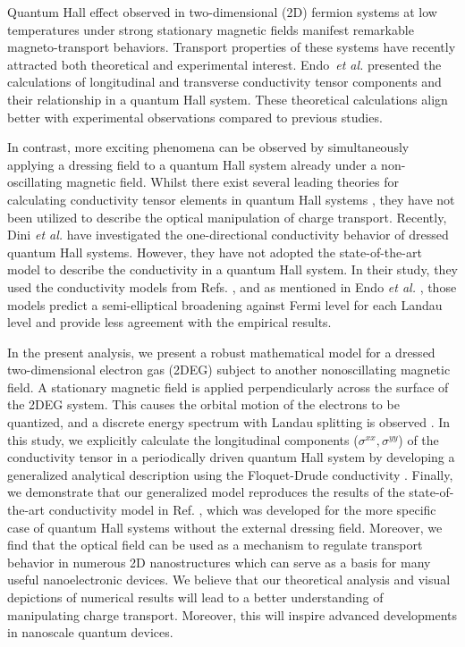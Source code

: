 Quantum Hall effect \cite{girvin90} observed in two-dimensional (2D) fermion systems at low temperatures under strong stationary magnetic fields manifest remarkable magneto-transport behaviors. Transport properties of these systems have recently attracted both theoretical \cite{ando72,ando74_1,ando74_2,ando74_3,ando74_4,ando82,endo09} and experimental \cite{allerman95,tieke97,pan05} interest.
Endo \textit{et al.} \cite{endo09} presented the calculations of longitudinal and transverse conductivity tensor components and their relationship in a quantum Hall system. These theoretical calculations  align better with experimental observations compared to previous studies.

In contrast, more exciting phenomena can be observed by simultaneously applying a dressing field to a quantum Hall system already under a non-oscillating magnetic field.
Whilst there exist several leading theories for calculating conductivity tensor elements in quantum Hall systems \cite{ando74_1,ando82,endo09}, they have not been utilized to describe the optical manipulation of charge transport.
Recently, Dini \textit{et al.} \cite{dini16} have investigated the one-directional conductivity behavior of dressed quantum Hall systems. However, they have not adopted the state-of-the-art model to describe the conductivity in a quantum Hall system. In their study, they used the conductivity models from Refs. \cite{ando74_1,ando82}, and as mentioned in Endo \textit{et al.} \cite{endo09}, those models predict a semi-elliptical broadening against Fermi level for each Landau level and provide less agreement with the empirical results.

In the present analysis, we present a robust mathematical model for a dressed two-dimensional electron gas (2DEG) subject to another nonoscillating magnetic field.
A stationary magnetic field is applied perpendicularly across the surface of the 2DEG system. This causes the orbital motion of the electrons to be quantized, and a discrete energy spectrum with Landau splitting is observed \cite{landau30}.
In this study, we explicitly calculate the longitudinal components ($\sigma^{xx},\sigma^{yy}$) of the conductivity tensor in a periodically driven quantum Hall system by developing a generalized analytical description using the Floquet-Drude conductivity \cite{wackerl20}.
Finally, we demonstrate that our generalized model reproduces the results of the state-of-the-art conductivity model in Ref. \cite{endo09}, which was developed for the more specific case of quantum Hall systems without the external dressing field.
Moreover, we find that the optical field can be used as a mechanism to regulate transport behavior in numerous 2D nanostructures which can serve as a basis for many useful nanoelectronic devices. We believe that our theoretical analysis and visual depictions of numerical results will lead to a better understanding of manipulating charge transport. Moreover, this will inspire advanced  developments in nanoscale quantum devices.

